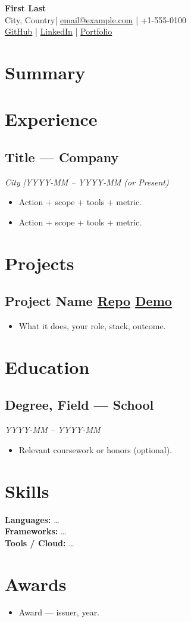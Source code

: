 \documentclass[10pt,letterpaper]{article}
\makeatletter
\newcommand{\Name}{First Last}
\newcommand{\Email}{email@example.com}
\newcommand{\Phone}{+1-555-0100}
\newcommand{\Location}{City, Country}
\newcommand{\LinkedIn}{https://linkedin.com/in/username}
\newcommand{\GitHub}{https://github.com/username}
\newcommand{\Portfolio}{https://example.com}
\makeatother
\begin{document}
\begin{center}
  {\LARGE\bfseries \Name}\\[0.35em]
  \Location \quad|\quad
  \href{mailto:\Email}{\Email} \quad|\quad
  \Phone\\[0.2em]
  \href{\GitHub}{GitHub} \quad|\quad
  \href{\LinkedIn}{LinkedIn} \quad|\quad
  \href{\Portfolio}{Portfolio}
\end{center}

\section{Summary}

\section{Experience}
\subsection{Title --- Company}
\textit{City \quad|\quad YYYY-MM -- YYYY-MM (or Present)}
\begin{itemize}
  \item Action + scope + tools + metric.
  \item Action + scope + tools + metric.
\end{itemize}

\section{Projects}
\subsection{Project Name \quad \href{https://github.com/org/repo}{Repo} \quad \href{https://demo.example}{Demo}}
\begin{itemize}
  \item What it does, your role, stack, outcome.
\end{itemize}

\section{Education}
\subsection{Degree, Field --- School}
\textit{YYYY-MM -- YYYY-MM}
\begin{itemize}
  \item Relevant coursework or honors (optional).
\end{itemize}

\section{Skills}
\textbf{Languages:} \ldots\\
\textbf{Frameworks:} \ldots\\
\textbf{Tools / Cloud:} \ldots

\section{Awards}
\begin{itemize}
  \item Award --- issuer, year.
\end{itemize}
\end{document}

